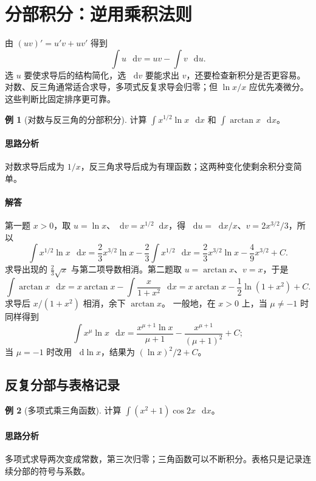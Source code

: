 \documentclass[UTF8,fontset=fandol,12pt,oneside,openany]{ctexrep}
\newcommand{\dd}{\mathop{}\!\mathrm d}
\theoremstyle{definition}
\newtheorem{example}{例}[chapter]
\begin{document}
\section{分部积分：逆用乘积法则}
\label{lec:10:parts}
由 $(uv)'=u'v+uv'$ 得到
\[
\int u\,\dd v=uv-\int v\,\dd u.
\]
选 $u$ 要使求导后的结构简化，选 $\dd v$ 要能求出 $v$，还要检查新积分是否更容易。对数、反三角通常适合求导，多项式反复求导会归零；但 $\ln x/x$ 应优先凑微分。这些判断比固定排序更可靠。

\begin{example}[对数与反三角的分部积分]
计算 $\int x^{1/2}\ln x\,\dd x$ 和 $\int\arctan x\,\dd x$。
\end{example}
\paragraph{思路分析}对数求导后成为 $1/x$，反三角求导后成为有理函数；这两种变化使剩余积分变简单。
\paragraph{解答}第一题 $x>0$，取 $u=\ln x$、$\dd v=x^{1/2}\dd x$，得 $\dd u=\dd x/x$、$v=2x^{3/2}/3$，所以
\[
\int x^{1/2}\ln x\,\dd x
=\frac23x^{3/2}\ln x-\frac23\int x^{1/2}\,\dd x
=\frac23x^{3/2}\ln x-\frac49x^{3/2}+C.
\]
求导出现的 $\frac23\sqrt{x}$ 与第二项导数相消。第二题取 $u=\arctan x$、$v=x$，于是
\[
\int\arctan x\,\dd x=x\arctan x-\int\frac{x}{1+x^2}\,\dd x
=x\arctan x-\frac12\ln(1+x^2)+C.
\]
求导后 $x/(1+x^2)$ 相消，余下 $\arctan x$。
一般地，在 $x>0$ 上，当 $\mu\ne-1$ 时同样得到
\[
\int x^\mu\ln x\,\dd x=
\frac{x^{\mu+1}\ln x}{\mu+1}-\frac{x^{\mu+1}}{(\mu+1)^2}+C;
\]
当 $\mu=-1$ 时改用 $\dd\ln x$，结果为 $(\ln x)^2/2+C$。

\subsection{反复分部与表格记录}
\begin{example}[多项式乘三角函数]
计算 $\displaystyle\int(x^2+1)\cos2x\,\dd x$。
\end{example}
\paragraph{思路分析}多项式求导两次变成常数，第三次归零；三角函数可以不断积分。表格只是记录连续分部的符号与系数。
\end{document}
